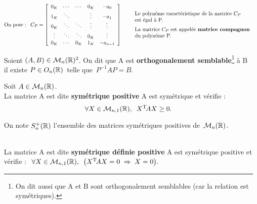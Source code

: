 \[\text{On pose : }\ C_P=\left[
\begin{array}{ccccc}
    0_K & \cdots & \cdots & 0_K & -a_0 \\
    1_K & \ddots & & \vdots & -a_1 \\
    0_K & \ddots & \ddots & \vdots & \vdots \\
    \vdots & \ddots & \ddots & 0_K & \vdots \\
    0_K & \cdots & 0_K & 1_K & -a_{n-1} \\
\end{array}
\right]\qquad
\begin{array}{l}
    \text{Le polynôme caractéristique de la matrice } C_P \\
    \text{est égal à P.}\vspace{0.2cm}\\
    \text{La matrice } C_P \text{ est appelée \textbf{matrice compagnon}\index{matrices!matrice compagnon}}\\
    \text{du polynôme P.}
\end{array} \]

\vspace{1.8cm}

Soient \((A,B)\in \mathcal{M}_n(\mathbb{R})^2\). On dit que A est \textbf{orthogonalement semblable}\footnote{On dit aussi que A et B sont orthogonalement semblables (car la relation est symétriques).} à B \ssi il existe \(P\in O_n(\mathbb{R})\,\) telle que \(\,P^{-1}AP=B.\)

\vspace{1.6cm}

Soit \(A\in \mathcal{M}_n(\mathbb{R})\).\\
La matrice A est dite \textbf{symétrique positive} \ssi A est symétrique et vérifie :\vspace{-0.3cm} \[\forall X\in \mathcal{M}_{n,1}(\mathbb{R}),\ \, X^\text{T}\!AX\geq 0.\]
\vspace{-0.7cm}

\begin{small}
    On note \(S_n^+(\mathbb{R})\) l'ensemble des matrices symétriques positives de \(\,\mathcal{M}_n(\mathbb{R})\).
\end{small}\vspace{0.7cm}\\
La matrice A est dite \textbf{symétrique définie positive} \ssi A est symétrique positive et\vspace{0.1cm}\\
vérifie : \(\ \forall X\in\mathcal{M}_{n,1}(\mathbb{R}),\ \, \bigl( X^\text{T}\!AX=0 \; \Rightarrow \; X=0 \bigr).\)\vspace{0.2cm}

